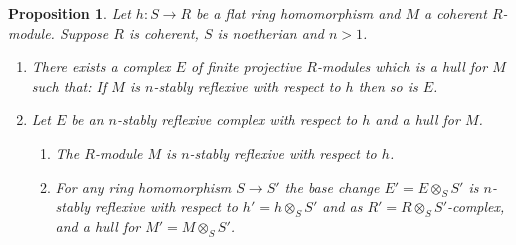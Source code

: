 \documentclass[a4paper,10pt]{amsart}
\theoremstyle{plain}
\newtheorem{prop}[xx]{Proposition}%
\theoremstyle{definition}
\theoremstyle{remark}
\numberwithin{equation}{xx}
\newcommand{\co}{\colon}
\newcommand{\ra}{\rightarrow}
\newcommand{\ot}{{\otimes}}
\begin{document}
\begin{prop}\label{prop.refcplx}
Let \(h\co S\ra R\) be a flat ring homomorphism and \(M\) a coherent \(R\)-module\textup{.} Suppose \(R\) is coherent\textup{,} \(S\) is noetherian and \(n>1\)\textup{.} 
\begin{enumerate}
\item[(i)] There exists a complex \(E\) of finite projective \(R\)-modules which is a hull for \(M\) such that\textup{:} 
If \(M\) is \(n\)-stably reflexive with respect to \(h\) then  so is \(E\)\textup{.}

\item[(ii)] Let \(E\) be an \(n\)-stably reflexive complex with respect to \(h\) and a hull for \(M\)\textup{.} 

\begin{enumerate}
\item The \(R\)-module \(M\) is \(n\)-stably reflexive with respect to \(h\)\textup{.}

\item For any ring homomorphism \(S\ra S'\) the base change \(E'=E\ot_{S}S'\)  is \(n\)-stably reflexive with respect to \(h'=h\ot_{S}S'\) and as \(R'=R\ot_{S}S'\)-complex\textup{,} and a hull for \(M'=M\ot_{S}S'\)\textup{.}
\end{enumerate}
\end{enumerate}
\end{prop}
\end{document}
